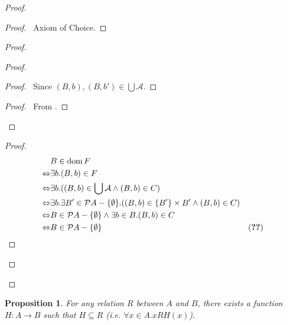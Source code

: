 \documentclass{book}
\let\qed\relax
\newtheorem{prop}[ax]{Proposition}
\theoremstyle{definition}
\newcommand{\dom}{\ensuremath{\operatorname{dom}}}
\newcommand{\ran}{\ensuremath{\operatorname{ran}}}
\begin{document}
\begin{proof}
\pf
{}
\begin{proof}
	\pf\ Axiom of Choice.
\end{proof}
\begin{proof}
	\begin{proof}
		\begin{proof}
			\pf\ Since $(B,b),(B,b') \in \bigcup \mathcal{A}$.
		\end{proof}
		\begin{proof}
			\pf\ From .
		\end{proof}
	\end{proof}
	\step{b}{$\dom F = \mathcal{P} A - \{ \emptyset \}$}
	\begin{proof}
		\pf
		\begin{align*}
			& B \in \dom F \\
			\Leftrightarrow & \exists b. (B,b) \in F \\
			\Leftrightarrow & \exists b. ((B,b) \in \bigcup \mathcal{A} \wedge (B,b) \in C) \\
			\Leftrightarrow & \exists b. \exists B' \in \mathcal{P} A - \{ \emptyset \}. ((B,b) \in \{ B' \} \times B' \wedge (B,b) \in C) \\
			\Leftrightarrow & B \in \mathcal{P} A - \{ \emptyset \} \wedge \exists b \in B. (B,b) \in C \\
			\Leftrightarrow & B \in \mathcal{P} A - \{ \emptyset \} & (\text{\stepref{5}})
		\end{align*}
	\end{proof}
	\step{c}{$\ran F \subseteq A$}
\end{proof}
\qed
\end{proof}

\begin{prop}
\label{prop:AxChoice}
For any relation $R$ between $A$ and $B$, there exists a function $H : A \rightarrow B$ such that $H \subseteq R$ (i.e. $\forall x \in A. xRH(x)$).
\end{prop}
\end{document}
